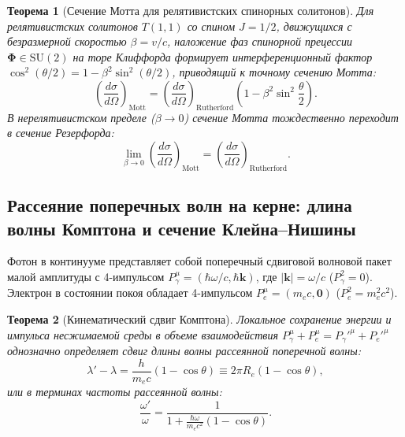 \documentclass[11pt,a4paper,oneside]{article}
\theoremstyle{plain}
\newtheorem{theorem}{Теорема}[section]
\theoremstyle{definition}
\theoremstyle{remark}
\numberwithin{equation}{section}
\begin{document}
	\begin{theorem}[Сечение Мотта для релятивистских спинорных солитонов]
		Для релятивистских солитонов $T(1,1)$ со спином $J=1/2$, движущихся с безразмерной скоростью $\beta = v/c$, наложение фаз спинорной прецессии $\boldsymbol{\Phi} \in \mathrm{SU}(2)$ на торе Клиффорда формирует интерференционный фактор $\cos^2(\theta/2) = 1 - \beta^2 \sin^2(\theta/2)$, приводящий к точному сечению Мотта:
		\begin{equation}
			\left( \frac{d\sigma}{d\Omega} \right)_{\text{Mott}} = \left( \frac{d\sigma}{d\Omega} \right)_{\text{Rutherford}} \left( 1 - \beta^2 \sin^2\frac{\theta}{2} \right).
			\label{eq:mott_cross_section}
		\end{equation}
		В нерелятивистском пределе ($\beta \to 0$) сечение Мотта тождественно переходит в сечение Резерфорда:
		\begin{equation}
			\lim_{\beta \to 0} \left( \frac{d\sigma}{d\Omega} \right)_{\text{Mott}} = \left( \frac{d\sigma}{d\Omega} \right)_{\text{Rutherford}}.
		\end{equation}
	\end{theorem}
	
	\subsection{Рассеяние поперечных волн на керне: длина волны Комптона и сечение Клейна--Нишины}
	
	Фотон в континууме представляет собой поперечный сдвиговой волновой пакет малой амплитуды с 4-импульсом $P_\gamma^\mu = (\hbar\omega/c, \hbar\mathbf{k})$, где $|\mathbf{k}| = \omega/c$ ($P_\gamma^2 = 0$). Электрон в состоянии покоя обладает 4-импульсом $P_e^\mu = (m_e c, \mathbf{0})$ ($P_e^2 = m_e^2 c^2$).
	
	\begin{theorem}[Кинематический сдвиг Комптона]
		Локальное сохранение энергии и импульса несжимаемой среды в объеме взаимодействия $P_\gamma^\mu + P_e^\mu = P_\gamma'^\mu + P_e'^\mu$ однозначно определяет сдвиг длины волны рассеянной поперечной волны:
		\begin{equation}
			\lambda' - \lambda = \frac{h}{m_e c} (1 - \cos\theta) \equiv 2\pi R_e (1 - \cos\theta),
			\label{eq:compton_shift}
		\end{equation}
		или в терминах частоты рассеянной волны:
		\begin{equation}
			\frac{\omega'}{\omega} = \frac{1}{1 + \frac{\hbar\omega}{m_e c^2}(1 - \cos\theta)}.
		\end{equation}
	\end{theorem}
	
\end{document}
